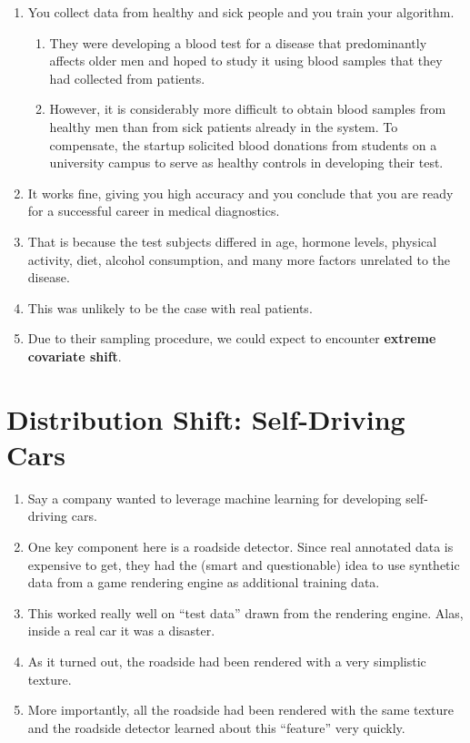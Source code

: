 \begin{enumerate}
    \item You collect data from healthy and sick people and you train your algorithm. 
    \begin{enumerate}
        \item They were developing a blood test for a disease that predominantly affects older men and hoped to study it using blood samples that they had collected from patients.

        \item However, it is considerably more difficult to obtain blood samples from healthy men than from sick patients already in the system. To compensate, the startup solicited blood donations from students on a university campus to serve as healthy controls in developing their test.
    \end{enumerate}

    \item It works fine, giving you high accuracy and you conclude that you are ready for a successful career in medical diagnostics.

    \item That is because the test subjects differed in age, hormone levels, physical activity, diet, alcohol consumption, and many more factors unrelated to the disease. 
    
    \item This was unlikely to be the case with real patients. 
    
    \item Due to their sampling procedure, we could expect to encounter \textbf{extreme covariate shift}.
\end{enumerate}

\section{Distribution Shift: Self-Driving Cars \cite{dnn-1}} \label{story: Distribution Shift: Self-Driving Cars}

\begin{enumerate}
    \item Say a company wanted to leverage machine learning for developing self-driving cars. 
    \item One key component here is a roadside detector. Since real annotated data is expensive to get, they had the (smart and questionable) idea to use synthetic data from a game rendering engine as additional training data. 
    \item This worked really well on “test data” drawn from the rendering engine. Alas, inside a real car it was a disaster. 
    \item As it turned out, the roadside had been rendered with a very simplistic texture. 
    \item More importantly, all the roadside had been rendered with the same texture and the roadside detector learned about this “feature” very quickly.
\end{enumerate}

